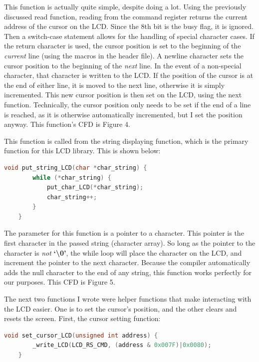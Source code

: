 \documentclass[a4paper, 12pt]{article}
\begin{document}
This function is actually quite simple, despite doing a lot. Using the previously discussed read function, reading from the command register returns the current address of the cursor on the LCD. Since the 8th bit is the busy flag, it is ignored. Then a switch-case statement allows for the handling of special character cases. If the return character is used, the cursor position is set to the beginning of the \textit{current} line (using the macros in the header file). A newline character sets the cursor position to the beginning of the \textit{next} line. In the event of a non-special character, that character is written to the LCD. If the position of the cursor is at the end of either line, it is moved to the next line, otherwise it is simply incremented. This new cursor position is then set on the LCD, using the next function. Technically, the cursor position only needs to be set if the end of a line is reached, as it is otherwise automatically incremented, but I set the position anyway. This function's CFD is Figure 4.

This function is called from the string displaying function, which is the primary function for this LCD library. This is shown below:

	\begin{mdframed}[backgroundcolor=code-gray, roundcorner=10pt,
								innerleftmargin=5, innertopmargin=5, innerbottommargin=5]	
	\begin{lstlisting}[language=C, caption=Writing a String to the LCD, tabsize=2]
	void put_string_LCD(char *char_string) {
		while (*char_string) {
			put_char_LCD(*char_string);
			char_string++;
		}
	}
	\end{lstlisting}
	\end{mdframed}
	
The parameter for this function is a pointer to a character. This pointer is the first character in the passed string (character array). So long as the pointer to the character is \textit{not} \textbf{`\textbackslash 0'}, the while loop will place the character on the LCD, and increment the pointer to the next character. Because the compiler automatically adds the null character to the end of any string, this function works perfectly for our purposes. This CFD is Figure 5.

The next two functions I wrote were helper functions that make interacting with the LCD easier. One is to set the cursor's position, and the other clears and resets the screen. First, the cursor setting function:

	\begin{mdframed}[backgroundcolor=code-gray, roundcorner=10pt,
								innerleftmargin=5, innertopmargin=5, innerbottommargin=5]	
	\begin{lstlisting}[language=C, caption=Cursor Position Setting, tabsize=2]
	void set_cursor_LCD(unsigned int address) {
		_write_LCD(LCD_RS_CMD, (address & 0x007F)|0x0080);
	}
	\end{lstlisting}
	\end{mdframed}
	
\end{document}
